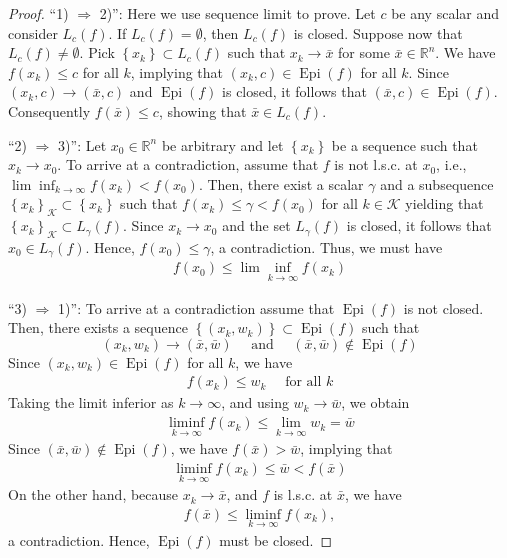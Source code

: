 \documentclass{article}
\newcommand{\Epi}{\operatorname{Epi} }
\begin{document}
\begin{proof}\color{ForestGreen}
``1) $\Rightarrow$ 2)'': Here we  use sequence limit to prove. Let $c$ be any scalar and consider $L_{c}(f)$. If $L_{c}(f)=\emptyset$, then $L_{c}(f)$ is closed. Suppose now that $L_{c}(f) \neq \emptyset$. Pick $\left\{x_{k}\right\} \subset L_{c}(f)$ such that $x_{k} \rightarrow \bar{x}$ for some $\bar{x} \in \mathbb{R}^{n} .$ We have $f\left(x_{k}\right) \leq c$ for all $k$, implying that $\left(x_{k}, c\right) \in\Epi (f)$ for all $k$. Since $\left(x_{k}, c\right) \rightarrow(\bar{x}, c)$ and $\Epi (f)$ is closed, it follows that $(\bar{x}, c) \in\Epi (f)$. Consequently $f(\bar{x}) \leq c$, showing that $\bar{x} \in L_{c}(f)$.

``2) $\Rightarrow$ 3)'': Let $x_{0} \in \mathbb{R}^{n}$ be arbitrary and let $\left\{x_{k}\right\}$ be a sequence such that $x_{k} \rightarrow x_{0}$. To arrive at a contradiction, assume that $f$ is not l.s.c. at $x_{0}$, i.e.,
$\lim \inf _{k \rightarrow \infty} f\left(x_{k}\right)<f\left(x_{0}\right)$.
Then, there exist a scalar $\gamma$ and a subsequence $\left\{x_{k}\right\}_{\mathcal{K}} \subset\left\{x_{k}\right\}$ such that $f\left(x_{k}\right) \leq \gamma<f\left(x_{0}\right)$ for all $k \in \mathcal{K}$
yielding that $\left\{x_{k}\right\}_{\mathcal{K}} \subset L_{\gamma}(f)$. Since $x_{k} \rightarrow x_{0}$ and the set $L_{\gamma}(f)$ is closed, it follows that $x_{0} \in L_{\gamma}(f)$. Hence, $f\left(x_{0}\right) \leq \gamma$, a contradiction. Thus, we must have
\begin{align*}
f\left(x_{0}\right) \leq \lim \inf _{k \rightarrow \infty} f\left(x_{k}\right)
\end{align*}

``3) $\Rightarrow$ 1)'': To arrive at a contradiction assume that $\Epi (f)$ is not closed. Then, there exists a sequence $\left\{\left(x_{k}, w_{k}\right)\right\} \subset \Epi (f)$ such that 
$$\left(x_{k}, w_{k}\right) \rightarrow(\bar{x}, \bar{w}) \quad \text{ and } \quad(\bar{x}, \bar{w}) \notin \Epi (f) $$
Since $\left(x_{k}, w_{k}\right) \in \Epi (f)$ for all $k$, we have
\begin{align*}
f\left(x_{k}\right) \leq w_{k} \quad \text { for all } k
\end{align*}
Taking the limit inferior as $k \rightarrow \infty$, and using $w_{k} \rightarrow \bar{w}$, we obtain
\begin{align*}
\liminf _{k \rightarrow \infty} f\left(x_{k}\right) \leq \lim _{k \rightarrow \infty} w_{k}=\bar{w}
\end{align*}
Since $(\bar{x}, \bar{w}) \notin\Epi (f)$, we have $f(\bar{x})>\bar{w}$, implying that
\begin{align*}
\liminf _{k \rightarrow \infty} f\left(x_{k}\right) \leq \bar{w}<f(\bar{x})
\end{align*}
On the other hand, because $x_{k} \rightarrow \bar{x}$, and $f$ is l.s.c. at $\bar{x}$, we have
\begin{align*}
f(\bar{x}) \leq \liminf _{k \rightarrow \infty} f\left(x_{k}\right),
\end{align*}
a contradiction. Hence,  $\Epi (f)$ must be closed.
\end{proof}
\end{document}
